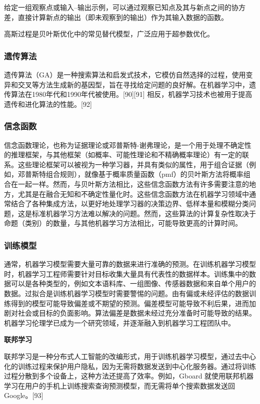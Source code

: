 给定一组观察点或输入–输出示例，可以通过观察已知点及其与新点之间的协方差，直接计算新点的输出（即未观察到的输出）作为其输入数据的函数。

高斯过程是贝叶斯优化中的常见替代模型，广泛应用于超参数优化。
\subsubsection{遗传算法}  
遗传算法（GA）是一种搜索算法和启发式技术，它模仿自然选择的过程，使用变异和交叉等方法生成新的基因型，旨在寻找给定问题的良好解。在机器学习中，遗传算法在1980年代和1990年代被使用。[90][91] 相反，机器学习技术也被用于提高遗传和进化算法的性能。[92]
\subsubsection{信念函数}   
信念函数理论，也称为证据理论或邓普斯特-谢弗理论，是一个用于处理不确定性的推理框架，与其他框架（如概率、可能性理论和不精确概率理论）有一定的联系。这些理论框架可以被视为一种学习器，并具有类似的属性，用于组合证据（例如，邓普斯特组合规则），就像基于概率质量函数（pmf）的贝叶斯方法将概率组合在一起一样。然而，与贝叶斯方法相比，这些信念函数方法有许多需要注意的地方，尤其是在融合无知和不确定性量化时。这些信念函数方法在机器学习领域中通常结合了各种集成方法，以更好地处理学习器的决策边界、低样本量和模糊分类问题，这是标准机器学习方法难以解决的问题。然而，这些算法的计算复杂性取决于命题（类别）的数量，与其他机器学习方法相比，可能导致更高的计算时间。
\subsubsection{训练模型} 
通常，机器学习模型需要大量可靠的数据来进行准确的预测。在训练机器学习模型时，机器学习工程师需要针对目标收集大量具有代表性的数据样本。训练集中的数据可以是各种类型的，例如文本语料库、一组图像、传感器数据和来自单个用户的数据。过拟合是训练机器学习模型时需要警惕的问题。由有偏或未经评估的数据训练得到的模型可能导致偏差或不期望的预测。偏差模型可能导致不利后果，进而加剧对社会或目标的负面影响。算法偏差是数据未经过充分准备时可能导致的结果。机器学习伦理学已成为一个研究领域，并逐渐融入到机器学习工程团队中。

\textbf{联邦学习}  
 
联邦学习是一种分布式人工智能的改编形式，用于训练机器学习模型，通过去中心化的训练过程来保护用户隐私，因为无需将数据发送到中心化服务器。通过将训练过程分散到多个设备上，这种方法还提高了效率。例如，Gboard 就使用联邦机器学习在用户的手机上训练搜索查询预测模型，而无需将单个搜索数据发送回 Google。[93]

